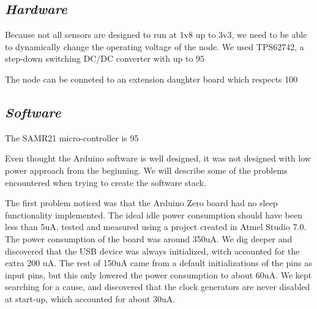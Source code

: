\label{chap:arch}



\subsection{\textit{Hardware}}

Because not all sensors are designed to run at 1v8 up to 3v3, we need to be able to dynamically change the operating voltage of the node. We used TPS62742, a step-down switching DC/DC converter with up to 95%

The node can be conneted to an extension daughter board which respects 100%

\subsection{\textit{Software}}

The SAMR21 micro-controller is 95%

Even thought the Arduino software is well designed, it was not designed with low power approach from the beginning. We will describe some of the problems encountered when trying to create the software stack.

The first problem noticed was that the Arduino Zero board had no sleep functionality implemented. The ideal idle power consumption should have been less than 5uA, tested and measured using a project created in Atmel Studio 7.0. The power consumption of the board was around 350uA. We dig deeper and discovered that the USB device was always initialized, witch accounted for the extra 200 uA. The rest of 150uA came from a default initializations of the pins as input pins, but this only lowered the power consumption to about 60uA. We kept searching for a cause, and discovered that the clock generators are never disabled at start-up, which accounted for about 30uA.

